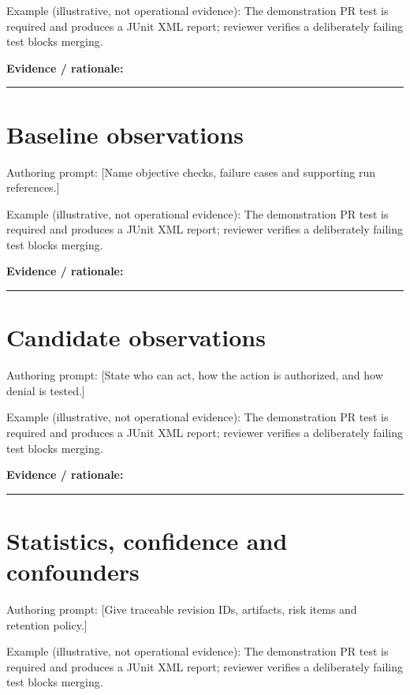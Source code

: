 \documentclass[11pt,letterpaper]{article}
\begin{document}
Example (illustrative, not operational evidence): The demonstration PR test is required and produces a JUnit XML report; reviewer verifies a deliberately failing test blocks merging.

\noindent\textbf{Evidence / rationale:}\par\nobreak\vspace{8pt}\noindent\rule{0.93\linewidth}{0.4pt}\par\vspace{14pt}
\section{Baseline observations}
Authoring prompt: [Name objective checks, failure cases and supporting run references.]

Example (illustrative, not operational evidence): The demonstration PR test is required and produces a JUnit XML report; reviewer verifies a deliberately failing test blocks merging.

\noindent\textbf{Evidence / rationale:}\par\nobreak\vspace{8pt}\noindent\rule{0.93\linewidth}{0.4pt}\par\vspace{14pt}
\section{Candidate observations}
Authoring prompt: [State who can act, how the action is authorized, and how denial is tested.]

Example (illustrative, not operational evidence): The demonstration PR test is required and produces a JUnit XML report; reviewer verifies a deliberately failing test blocks merging.

\noindent\textbf{Evidence / rationale:}\par\nobreak\vspace{8pt}\noindent\rule{0.93\linewidth}{0.4pt}\par\vspace{14pt}
\section{Statistics, confidence and confounders}
Authoring prompt: [Give traceable revision IDs, artifacts, risk items and retention policy.]

Example (illustrative, not operational evidence): The demonstration PR test is required and produces a JUnit XML report; reviewer verifies a deliberately failing test blocks merging.
\end{document}
